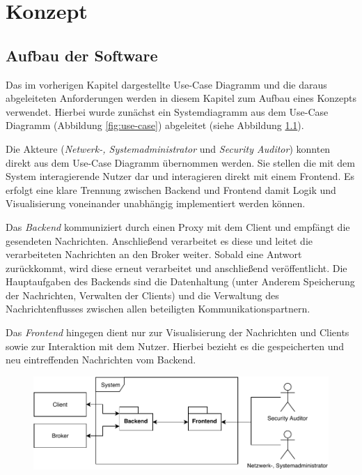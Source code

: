\chapter{Konzept}
\section{Aufbau der Software}
    Das im vorherigen Kapitel dargestellte Use-Case Diagramm und die daraus abgeleiteten Anforderungen werden in diesem Kapitel zum Aufbau eines Konzepts verwendet.
    Hierbei wurde zunächst ein Systemdiagramm aus dem Use-Case Diagramm (Abbildung \ref{fig:use-case}) abgeleitet (siehe Abbildung \ref{fig:system_all}).
    
    Die Akteure (\emph{Netwerk-, Systemadministrator} und \emph{Security Auditor}) konnten direkt aus dem Use-Case Diagramm übernommen werden.
    Sie stellen die mit dem System interagierende Nutzer dar und interagieren direkt mit einem Frontend.
    Es erfolgt eine klare Trennung zwischen Backend und Frontend damit Logik und Visualisierung voneinander unabhängig implementiert werden können.
    
    Das \emph{Backend} kommuniziert durch einen Proxy mit dem Client und empfängt die gesendeten Nachrichten. Anschließend verarbeitet es diese und leitet die verarbeiteten Nachrichten an den Broker weiter. Sobald eine Antwort zurückkommt, wird diese erneut verarbeitet und anschließend veröffentlicht.
    Die Hauptaufgaben des Backends sind die Datenhaltung (unter Anderem Speicherung der Nachrichten, Verwalten der Clients) und die Verwaltung des Nachrichtenflusses zwischen allen beteiligten Kommunikationspartnern.
    
    Das \emph{Frontend} hingegen dient nur zur Visualisierung der Nachrichten und Clients sowie zur Interaktion mit dem Nutzer. Hierbei bezieht es die gespeicherten und neu eintreffenden Nachrichten vom Backend.
    \begin{figure}[h]%
        \centering
        \includegraphics[width=14cm]{tex/bilder/4_konzept/Systemdiagram.pdf}
        \label{fig:system_all}
    \end{figure}
    

